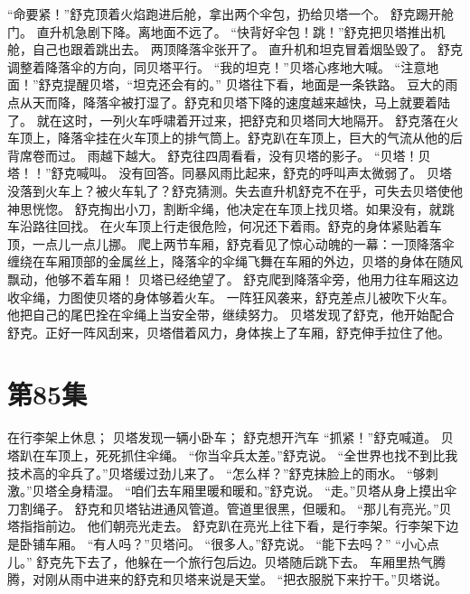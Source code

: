 \documentclass[a4paper,12pt,UTF8,twoside]{ctexbook}
\begin{document}
        “命要紧！”舒克顶着火焰跑进后舱，拿出两个伞包，扔给贝塔一个。 
        舒克踢开舱门。 
        直升机急剧下降。离地面不远了。 
        “快背好伞包！跳！”舒克把贝塔推出机舱，自己也跟着跳出去。 
        两顶降落伞张开了。 
        直升机和坦克冒着烟坠毁了。 
        舒克调整着降落伞的方向，同贝塔平行。 
        “我的坦克！”贝塔心疼地大喊。 
        “注意地面！”舒克提醒贝塔，“坦克还会有的。” 
        贝塔往下看，地面是一条铁路。 
        豆大的雨点从天而降，降落伞被打湿了。舒克和贝塔下降的速度越来越快，马上就要着陆了。 
        就在这时，一列火车呼啸着开过来，把舒克和贝塔同大地隔开。 
        舒克落在火车顶上，降落伞挂在火车顶上的排气筒上。舒克趴在车顶上，巨大的气流从他的后背席卷而过。 
        雨越下越大。 
        舒克往四周看看，没有贝塔的影子。 
        “贝塔！贝塔！！”舒克喊叫。 
        没有回答。同暴风雨比起来，舒克的呼叫声太微弱了。 
        贝塔没落到火车上？被火车轧了？舒克猜测。失去直升机舒克不在乎，可失去贝塔使他神思恍惚。 
        舒克掏出小刀，割断伞绳，他决定在车顶上找贝塔。如果没有，就跳车沿路往回找。 
        在火车顶上行走很危险，何况还下着雨。舒克的身体紧贴着车顶，一点儿一点儿挪。 
        爬上两节车厢，舒克看见了惊心动魄的一幕：一顶降落伞缠绕在车厢顶部的金属丝上，降落伞的伞绳飞舞在车厢的外边，贝塔的身体在随风飘动，他够不着车厢！ 
        贝塔已经绝望了。 
        舒克爬到降落伞旁，他用力往车厢这边收伞绳，力图使贝塔的身体够着火车。 
        一阵狂风袭来，舒克差点儿被吹下火车。他把自己的尾巴拴在伞绳上当安全带，继续努力。 
        贝塔发现了舒克，他开始配合舒克。正好一阵风刮来，贝塔借着风力，身体挨上了车厢，舒克伸手拉住了他。   \chapter{第85集} 
        在行李架上休息； 
        贝塔发现一辆小卧车； 
        舒克想开汽车   
        “抓紧！”舒克喊道。 
        贝塔趴在车顶上，死死抓住伞绳。 
        “你当伞兵太差。”舒克说。 
        “全世界也找不到比我技术高的伞兵了。”贝塔缓过劲儿来了。 
        “怎么样？”舒克抹脸上的雨水。 
        “够刺激。”贝塔全身精湿。 
        “咱们去车厢里暖和暖和。”舒克说。 
        “走。”贝塔从身上摸出伞刀割绳子。 
        舒克和贝塔钻进通风管道。管道里很黑，但暖和。 
        “那儿有亮光。”贝塔指指前边。 
        他们朝亮光走去。 
        舒克趴在亮光上往下看，是行李架。行李架下边是卧铺车厢。 
        “有人吗？”贝塔问。 
        “很多人。”舒克说。 
        “能下去吗？” 
        “小心点儿。” 
        舒克先下去了，他躲在一个旅行包后边。贝塔随后跳下去。 
        车厢里热气腾腾，对刚从雨中进来的舒克和贝塔来说是天堂。 
        “把衣服脱下来拧干。”贝塔说。 
\end{document}
